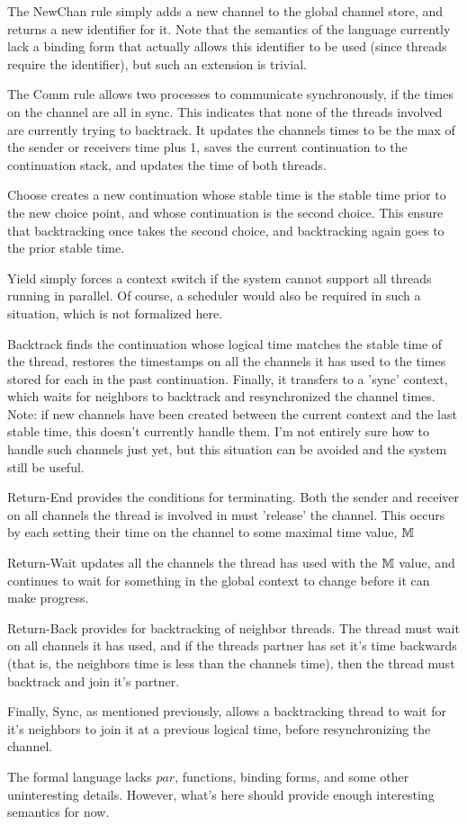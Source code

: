 \documentclass[9pt]{article}
\begin{document}
  \SyntaxFigure

  \SemanticsFigure

\clearpage 

  The NewChan rule simply adds a new channel to the global channel
  store, and returns a new identifier for it. Note that the semantics of
  the language currently lack a binding form that actually allows this
  identifier to be used (since threads require the identifier), but such
  an extension is trivial. 

  The Comm rule allows two processes to communicate synchronously, if
  the times on the channel are all in sync. This indicates that none of
  the threads involved are currently trying to backtrack. It updates the
  channels times to be the max of the sender or receivers time plus 1,
  saves the current continuation to the continuation stack, and updates
  the time of both threads.

  Choose creates a new continuation whose stable time is the stable time
  prior to the new choice point, and whose continuation is the second
  choice. This ensure that backtracking once takes the second choice,
  and backtracking again goes to the prior stable time.

  Yield simply forces a context switch if the system cannot support all
  threads running in parallel. Of course, a scheduler would also be
  required in such a situation, which is not formalized here.

  Backtrack finds the continuation whose logical time matches the stable
  time of the thread, restores the timestamps on all the
  channels it has used to the times stored for each in the past
  continuation.  Finally, it transfers to a 'sync' context, which waits
  for neighbors to backtrack and resynchronized the channel times.  
  Note: if new channels have been created between the current context
  and the last stable time, this doesn't currently handle them. I'm not
  entirely sure how to handle such channels just yet, but this situation
  can be avoided and the system still be useful.

  Return-End provides the conditions for terminating. Both the sender
  and receiver on all channels the thread is involved in must 'release'
  the channel. This occurs by each setting their time on the channel to
  some maximal time value, $\mathbb{M}$

  Return-Wait updates all the channels the thread has used with the
  $\mathbb{M}$ value, and continues to wait for something in the global
  context to change before it can make progress.

  Return-Back provides for backtracking of neighbor threads. The thread
  must wait on all channels it has used, and if the threads partner has set
  it's time backwards (that is, the neighbors time is less than the
  channels time), then the thread must backtrack and join it's partner.

  Finally, Sync, as mentioned previously, allows a backtracking thread
  to wait for it's neighbors to join it at a previous logical time,
  before resynchronizing the channel.


  The formal language lacks $par$, functions, binding forms, and some
  other uninteresting details. However, what's here should provide
  enough interesting semantics for now.
\end{document}
